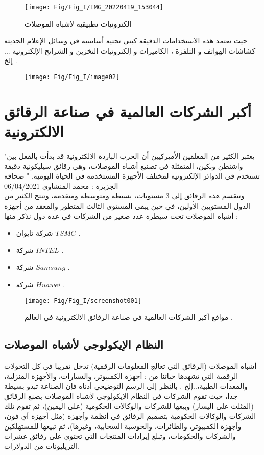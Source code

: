 \begin{figure}[h!]
	\centering
	\texttt{[image: Fig/Fig\_I/IMG\_20220419\_153044]}
	\caption{الكترونيات تطبيقية لاشباه الموصلات}
	\label{fig:img20220419153044}
\end{figure}
\FloatBarrier
حيث نعتمد هذه الاستخدامات الدقيقة كبنى تحتية أساسية في وسائل الإعلام الحديثة كشاشات الهواتف و التلفزة ، الكاميرات و إلكترونيات التخزين و الشرائح الإلكترونية ... إلخ .
\begin{figure}[h!]
	\centering
	\texttt{[image: Fig/Fig\_I/image02]}
	\caption{}
	\label{fig:image02}
\end{figure}
\FloatBarrier

\section { أكبر الشركات العالمية في صناعة الرقائق الالكترونية }

"يعتبر الكثير من المعلقين الأميركيين أن الحرب الباردة الالكترونية قد بدأت بالفعل بين واشنطن وبكين، المتمثلة في تصنيع أشباه الموصلات، وهي رقائق سيليكونية دقيقة تستخدم في الدوائر الإلكترونية لمختلف الأجهزة المستخدمة في الحياة اليومية. "  صحافة الجزيرة : محمد المنشاوي 06/04/2021 \\

وتتقسم هذه الرقائق إلى 3 مستويات، بسيطة ومتوسطة ومتقدمة، وتنتج الكثير من الدول المستويين الأولين، في حين يبقى المستوى الثالث المتطور والمعقد من أجهزة أشباه الموصلات تحت سيطرة عدد صغير من الشركات في عدة دول نذكر منها :

\begin{itemize}
	\item 
	شركة تايوان  $ TSMC $ .
	\item 
	شركة $ INTEL $ .
	\item 
	شركة $ Samsung $ .
	\item 
	شركة $ Huawei $ .
\end{itemize}

\begin{figure}[h!]
	\centering
	\texttt{[image: Fig/Fig\_I/screenshot001]}
	\caption{مواقع أكبر الشركات العالمية في صناعة الرقائق الالكترونية في العالم . }
	\label{fig:screenshot001}
\end{figure}
\FloatBarrier

\subsection{ النظام الإيكولوجي لأشباه الموصلات }
أشباه الموصلات (الرقائق التي تعالج المعلومات الرقمية) تدخل تقريبا في كل  التحولات الرقمية التي تشهدها حياتنا من : أجهزة الكمبيوتر، والسيارات، والأجهزة المنزلية، والمعدات الطبية،..إلخ .
بالنظر إلى الرسم التوضيحي أدناه  فإن الصناعة تبدو بسيطة جدا، حيث تقوم الشركات في النظام الإيكولوجي لأشباه الموصلات بصنع الرقائق (المثلث على اليسار) وبيعها للشركات والوكالات الحكومية (على اليمين)، ثم تقوم تلك الشركات والوكالات الحكومية بتصميم الرقائق في أنظمة وأجهزة (مثل أجهزة آي فون، وأجهزة الكمبيوتر، والطائرات، والحوسبة السحابية، وغيرها)، ثم تبيعها للمستهلكين والشركات والحكومات، وتبلغ إيرادات المنتجات التي تحتوي على رقائق عشرات التريليونات من الدولارات.

